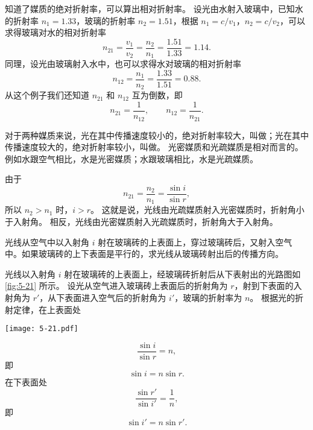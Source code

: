 知道了媒质的绝对折射率，可以算出相对折射率。
设光由水射入玻璃中，已知水的折射率 $n_1=1.33$，玻璃的折射率 $n_2=1.51$，根据 $n_1=c/v_1$，$n_2=c/v_2$，可以求得玻璃对水的相对折射率
\[ n_{21}=\frac{v_1}{v_2}=\frac{n_2}{n_1}=\frac{1.51}{1.33}=1.14.\]
同理，设光由玻璃射入水中，也可以求得水对玻璃的相对折射率
\[n_{12}=\frac{n_1}{n_2}=\frac{1.33}{1.51}=0.88.\]
从这个例子我们还知道 $n_{21}$ 和 $n_{12}$ 互为倒数，即
\[n_{21}=\frac{1}{n_{12}},\qquad n_{12}=\frac{1}{n_{21}}.\]

对于两种媒质来说，光在其中传播速度较小的，绝对折射率较大，叫做；光在其中传播速度较大的，绝对折射率较小，叫做。
光密媒质和光疏媒质是相对而言的。例如水跟空气相比，水是光密媒质；水跟玻璃相比，水是光疏媒质。

由于
\[n_{21}=\frac{n_2}{n_1}=\frac{\sin i}{\sin r},\]
所以 $n_2>n_1$ 时，$i>r$。
这就是说，光线由光疏媒质射入光密媒质时，折射角小于入射角。
相反，光线由光密媒质射入光疏媒质时，折射角大于入射角。

\begin{example}\label{exp:5-1}
光线从空气中以入射角 $i$ 射在玻璃砖的上表面上，穿过玻璃砖后，又射入空气中。如果玻璃砖的上下表面是平行的，求光线从玻璃砖射出后的传播方向。
\end{example}

\medskip\noindent
\begin{minipage}{0.58\linewidth}
\begin{solution}
光线以入射角 $i$ 射在玻璃砖的上表面上，经玻璃砖折射后从下表射出的光路图如 \cref{fig:5-21} 所示。
设光从空气进入玻璃砖上表面后的折射角为 $r$，射到下表面的入射角为 $r'$，从下表面进入空气后的折射角为 $i'$，玻璃的折射率为 $n$。
根据光的折射定律，在上表面处
\end{solution}
\end{minipage}\hfill
\begin{minipage}{0.38\linewidth}\centering
  \begin{figurehere}
    \texttt{[image: 5-21.pdf]}
    \caption{}\label{fig:5-21}
  \end{figurehere}
\end{minipage}

\smallskip
\[\frac{\sin i}{\sin r}=n, \]
即
\begin{equation}
  \label{eq:sini_vs_sinr1}
  \sin i=n\sin r. 
\end{equation}
在下表面处
\[\frac{\sin r'}{\sin i'}=\frac{1}{n}, \]
即
\begin{equation}
  \label{eq:sini_vs_sinr2}
  \sin i' =n \sin r'.
\end{equation}


